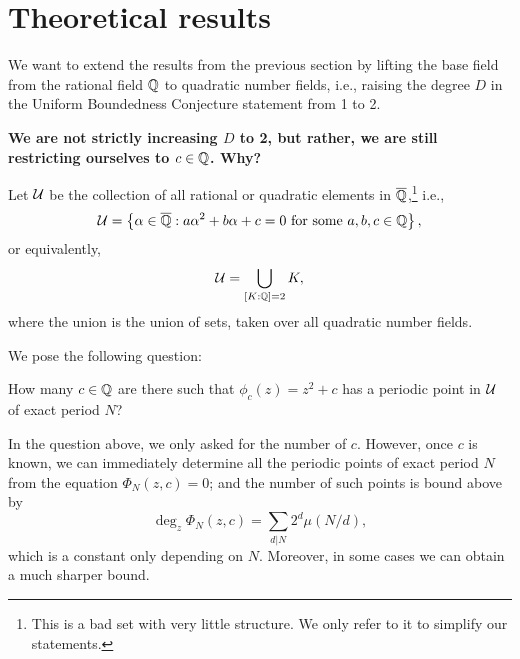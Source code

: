 \section{Theoretical results}
\label{sec:th}

We want to extend the results from the previous section by lifting the
base field from the rational field $\mathbb{Q}$ to quadratic number fields,
i.e., raising the degree $D$ in the Uniform Boundedness Conjecture
statement from 1 to 2.

\begin{remark}
  \textbf{We are not strictly increasing $D$ to 2, but rather, we are
    still restricting ourselves to $c \in \mathbb{Q}$. Why?}
\end{remark}

Let $\mathcal{U}$ be the collection of all rational or quadratic elements in
$\overline{\mathbb{Q}}$,\footnote{%
  This is a bad set with very little structure. We only refer
  to it to simplify our statements.}
i.e.,
\[
\mathcal{U} = \left\{\alpha \in \overline{\mathbb{Q}}: \text{$a \alpha^2 + b \alpha + c = 0$
    for some $a, b, c \in \mathbb{Q}$}\right\},
\]
or equivalently,
\[
\mathcal{U} = \bigcup_{[K : \mathbb{Q}] = 2}K,
\]
where the union is the union of sets, taken over all quadratic number
fields.

We pose the following question:


\begin{question}
  \label{question}
  How many $c \in \mathbb{Q}$ are there such that $\phi_c(z) = z^2 + c$ has a
  periodic point in $\mathcal{U}$ of exact period $N$?
\end{question}

\begin{remark}
  In the question above, we only asked for the number of $c$. However,
  once $c$ is known, we can immediately determine all the periodic
  points of exact period $N$ from the equation $\Phi_N(z, c) = 0$; and
  the number of such points is bound above by
  \[
  \deg_z \Phi_N(z, c) = \sum_{d|N}2^d \mu(N/d),
  \]
  which is a constant only depending on $N$. Moreover,
  in some cases we can obtain a much sharper bound.
\end{remark}

